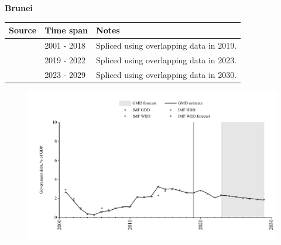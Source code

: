 \documentclass[12pt,a4paper,landscape]{article}
\begin{document}
\begin{adjustbox}{max totalsize={\paperwidth}{\paperheight},center}
\begin{minipage}[t][\textheight][t]{\textwidth}
\vspace*{0.5cm}
{}
\begin{center}
{\Large\bfseries Brunei}
\end{center}
\vspace{0.5cm}
\begin{table}[H]
\centering
\small
\begin{tabular}{|l|l|l|}
\hline
\textbf{Source} & \textbf{Time span} & \textbf{Notes} \\
\hline
\rowcolor{white}\cite{IMF_GDD}& 2001 - 2018 &Spliced using overlapping data in 2019.\\
\rowcolor{lightgray}\cite{IMF_WEO}& 2019 - 2022 &Spliced using overlapping data in 2023.\\
\rowcolor{white}\cite{IMF_WEO_forecast}& 2023 - 2029 &Spliced using overlapping data in 2030.\\
\hline
\end{tabular}
\end{table}
\begin{figure}[H]
\centering
\includegraphics[width=\textwidth,height=0.6\textheight,keepaspectratio]{graphs/BRN_govdebt_GDP.pdf}
\end{figure}
\end{minipage}
\end{adjustbox}
\end{document}
